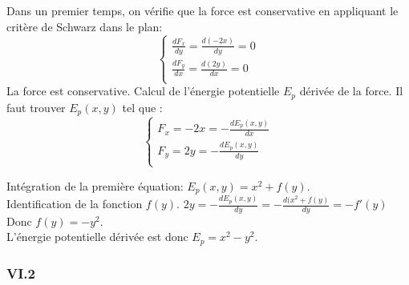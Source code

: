 \documentclass[]{book}
\theoremstyle{definition}
\begin{document}
Dans un premier temps, on v\'erifie que la force est conservative en appliquant le crit\`ere de Schwarz dans le plan:
$$
\left\{
\begin{array}{l }
	\frac{dF_x}{dy} = \frac{d(-2x)}{dy} = 0\\
	\frac{dF_y}{dx} = \frac{d(2y)}{dx} = 0\\
\end{array}
\right. 
$$
La force est conservative. Calcul de l'\'energie potentielle $E_p$ d\'eriv\'ee de la force. Il faut trouver $E_p(x,y)$ tel que :
$$
\left\{
\begin{array}{l }
	F_x = -2x = -\frac{dE_p(x,y)}{dx} \\
	F_y =  2y = -\frac{dE_p(x,y)}{dy} \\
\end{array}
\right. 
$$

Int\'egration de la premi\`ere \'equation: $E_p(x,y) = x^2 + f(y)$.\\
Identification de la fonction $f(y)$. $2y = -\frac{dE_p(x,y)}{dy} = -\frac{d(x^2+f(y)}{dy} = -f'(y)$ Donc $f(y) = -y^2$.\\

L'\'energie potentielle d\'eriv\'ee est donc $E_p = x^2 - y^2$.


\subsubsection*{VI.2}
\end{document}
